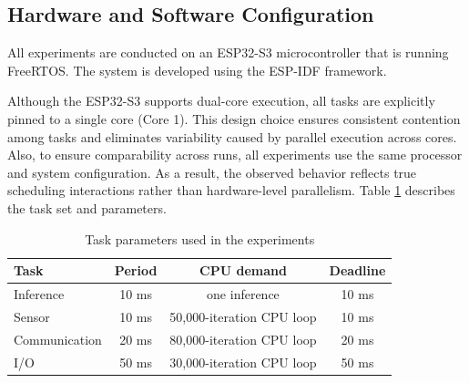 \documentclass[conference]{IEEEtran}
\begin{document}
\subsection{Hardware and Software Configuration} 
All experiments are conducted on an ESP32-S3 microcontroller that is running FreeRTOS. The system is developed using the ESP-IDF framework. 

Although the ESP32-S3 supports dual-core execution, all tasks are explicitly pinned to a single core (Core 1). This design choice ensures consistent contention among tasks and eliminates variability caused by parallel execution across cores. 
Also, to ensure comparability across runs, all experiments use the same processor and system configuration.
As a result, the observed behavior reflects true scheduling interactions rather than hardware-level parallelism. %
Table \ref{tab:task_params} describes the task set and parameters. 

\begin{table}[h]
\centering
\caption{Task parameters used in the experiments}
\label{tab:task_params}
\begin{tabular}{lccc}
\hline
\textbf{Task} & \textbf{Period} & \textbf{CPU demand} & \textbf{Deadline} \\
\hline
Inference & 10 ms & one inference & 10 ms \\
Sensor & 10 ms & 50{,}000-iteration CPU loop & 10 ms \\
Communication & 20 ms & 80{,}000-iteration CPU loop & 20 ms \\
I/O & 50 ms & 30{,}000-iteration CPU loop & 50 ms \\
\hline
\end{tabular}
\end{table}
\end{document}
